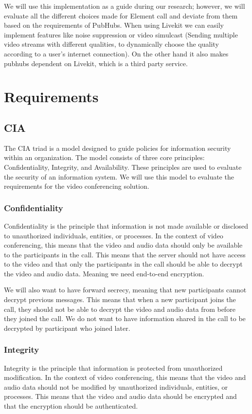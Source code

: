 \documentclass{report}
\begin{document}
We will use this implementation as a guide during our research; however, we will evaluate all the different choices
made for Element call and deviate from them based on the requirements of PubHubs. When using Livekit we can easily
implement features like noise suppression or video simulcast (Sending multiple video streams with different
qualities, to dynamically choose the quality according to a user's internet connection). On the other hand it
also makes pubhubs dependent on Livekit, which is a third party service.


\chapter{Requirements}
\section{CIA}
The CIA triad is a model designed to guide policies for information security within an organization. The model
consists of three core principles: Confidentiality, Integrity, and Availability. These principles are used to
evaluate the security of an information system. We will use this model to evaluate the requirements for the video
conferencing solution.

\subsection{Confidentiality}
Confidentiality is the principle that information is not made available or disclosed to unauthorized individuals,
entities, or processes. In the context of video conferencing, this means that the video and audio data should only
be available to the participants in the call. This means that the server should not have access to the video and
that only the participants in the call should be able to decrypt the video and audio data. Meaning we need end-to-end
encryption.

We will also want to have forward secrecy, meaning that new participants cannot decrypt previous messages. This
means that when a new participant joins the call, they should not be able to decrypt the video and audio data from
before they joined the call. We do not want to have information shared in the call to be decrypted by participant who
joined later.

\subsection{Integrity}
Integrity is the principle that information is protected from unauthorized modification. In the context of video
conferencing, this means that the video and audio data should not be modified by unauthorized individuals, entities,
or processes. This means that the video and audio data should be encrypted and that the encryption should be
authenticated. 
\end{document}
